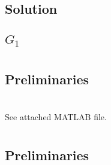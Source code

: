 \documentclass[]{article}
\numberwithin{equation}{section}
\begin{document}
\subsection*{Solution}
\subsection{$G_1$}










\newpage
\section{}
\subsection*{Preliminaries}
























\newpage
\section{}

See attached MATLAB file.

\section{}
\subsection*{Preliminaries}
\end{document}
